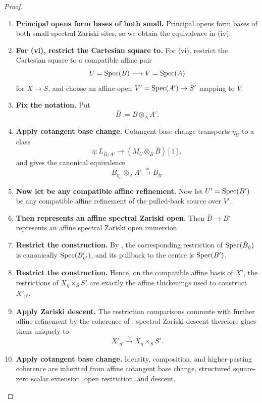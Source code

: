 \begin{proof}
\begin{enumerate}[label=\textup{(\arabic*)}]
    \item \textbf{Principal opens form bases of both small.}
    Principal opens form bases of both small spectral Zariski sites, so we obtain the
    equivalence in \textup{(iv)}.

    \item \textbf{For (vi), restrict the Cartesian square to.}
    For \textup{(vi)}, restrict the Cartesian square to a compatible affine pair
    \[
        U=\operatorname{Spec}(B)\longrightarrow V=\operatorname{Spec}(A)
    \]
    for \(X\to S\), and choose an affine open \(V'=\operatorname{Spec}(A')\to S'\) mapping to \(V\).

    \item \textbf{Fix the notation.}
    Put
    \[
        \bar B:=B\otimes_AA'.
    \]

    \item \textbf{Apply cotangent base change.}
    Cotangent base change transports \(\eta_U\) to a class
    \[
        \bar\eta:L_{\bar B/A'}\longrightarrow
        (M_U\otimes_B\bar B)[1],
    \]
    and  gives the canonical equivalence
    \[
        B_{\eta_U}\otimes_AA'
        \xrightarrow{\simeq}
        \bar B_{\bar\eta}.
    \]

    \item \textbf{Now let be any compatible affine refinement.}
    Now let \(U'=\operatorname{Spec}(B')\) be any compatible affine refinement of the pulled-back source over
    \(V'\).

    \item \textbf{Then represents an affine spectral Zariski open.}
    Then \(\bar B\to B'\) represents an affine spectral Zariski open immersion.

    \item \textbf{Restrict the construction.}
    By , the corresponding restriction of
    \(\operatorname{Spec}(\bar B_{\bar\eta})\) is canonically \(\operatorname{Spec}(B'_{\eta'})\), and its pullback to the centre is \(\operatorname{Spec}(B')\).

    \item \textbf{Restrict the construction.}
    Hence, on the compatible affine basis of \(X'\), the restrictions of \(X_\eta\times_SS'\) are
    exactly the affine thickenings used to construct \(X'_{\eta'}\).

    \item \textbf{Apply Zariski descent.}
    The restriction comparisons commute with further affine refinement by the coherence of
    ; spectral Zariski descent therefore glues
    them uniquely to
    \[
        X'_{\eta'}\xrightarrow{\simeq}X_\eta\times_SS'.
    \]

    \item \textbf{Apply cotangent base change.}
    Identity, composition, and higher-pasting coherence are inherited from affine cotangent base
    change, structured square-zero scalar extension, open restriction, and descent.
\end{enumerate}
\end{proof}

